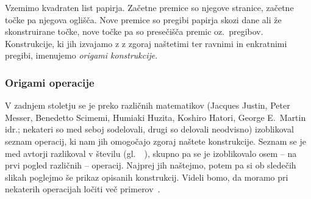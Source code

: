 \begin{definicija}
    \label{def:origami_konstruktibilnost}
    Vzemimo kvadraten list papirja. Začetne premice so njegove stranice, začetne točke pa njegova oglišča. Nove premice so pregibi papirja skozi dane ali že skonstruirane točke, nove točke pa so presečišča premic oz.\ pregibov. Konstrukcije, ki jih izvajamo z z zgoraj naštetimi ter ravnimi in enkratnimi pregibi, imenujemo \emph{origami konstrukcije}.
\end{definicija}

\subsubsection{Origami operacije}
\label{podpodpogl:operacije}

V zadnjem stoletju se je preko različnih matematikov (Jacques Justin, Peter Messer, Benedetto Scimemi, Humiaki Huzita, Koshiro Hatori, George E.\ Martin idr.; nekateri so med seboj sodelovali, drugi so delovali neodvisno) izoblikoval seznam operacij, ki nam jih omogočajo zgoraj naštete konstrukcije. Seznam se je med avtorji razlikoval v številu (gl.\ ~\cite[str.\ 29--30]{hull2020}), skupno pa se je izoblikovalo osem -- na prvi pogled različnih -- operacij. Najprej jih naštejmo, potem pa si ob sledečih slikah poglejmo še prikaz opisanih konstrukcij. Videli bomo, da moramo pri nekaterih operacijah ločiti več primerov~\cite{michael2005, zore2022}.

\renewcommand{\theoperacija}{O\arabic{operacija}}

